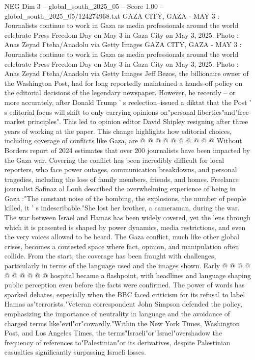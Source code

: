 \begin{textsample}{NEG Dim 3 – global\_south\_2025\_05 – Score 1.00 – global\_south\_2025\_05/124274968.txt}  \label{ex:f3_neg_226}
GAZA CITY, GAZA - MAY 3 : Journalists continue to work in Gaza as media professionals around the world celebrate Press Freedom Day on May 3 in Gaza City on May 3, 2025.
Photo : Anas Zeyad Fteha/Anadolu via Getty Images GAZA CITY, GAZA - MAY 3 : Journalists continue to work in Gaza as media professionals around the world celebrate Press Freedom Day on May 3 in Gaza City on May 3, 2025.
Photo : Anas Zeyad Fteha/Anadolu via Getty Images Jeff Bezos, the billionaire owner of the Washington Post, had for long reportedly maintained a hands-off policy on the editorial decisions of the legendary newspaper.
However, he recently -- or more accurately, after Donald Trump ' s reelection--issued a diktat that the Post ' s editorial focus will shift to only carrying opinions on"personal liberties"and"free-market principles".
This led to opinion editor David Shipley resigning after three years of working at the paper.
This change highlights how editorial choices, including coverage of conflicts like Gaza, are @ @ @ @ @ @ @ @ @ @ Without Borders report of 2024 estimates that over 200 journalists have been impacted by the Gaza war.
Covering the conflict has been incredibly difficult for local reporters, who face power outages, communication breakdowns, and personal tragedies, including the loss of family members, friends, and homes.
Freelance journalist Safinaz al Louh described the overwhelming experience of being in Gaza :"The constant noise of the bombing, the explosions, the number of people killed, it ' s indescribable."She lost her brother, a cameraman, during the war.
The war between Israel and Hamas has been widely covered, yet the lens through which it is presented is shaped by power dynamics, media restrictions, and even the very voices allowed to be heard.
The Gaza conflict, much like other global crises, becomes a contested space where fact, opinion, and manipulation often collide.
From the start, the coverage has been fraught with challenges, particularly in terms of the language used and the images shown.
Early @ @ @ @ @ @ @ @ @ @ hospital became a flashpoint, with headlines and language shaping public perception even before the facts were confirmed.
The power of words has sparked debates, especially when the BBC faced criticism for its refusal to label Hamas as"terrorists."Veteran correspondent John Simpson defended the policy, emphasizing the importance of neutrality in language and the avoidance of charged terms like"evil"or"cowardly."Within the New York Times, Washington Post, and Los Angeles Times, the terms"Israeli"or"Israel"overshadow the frequency of references to"Palestinian"or its derivatives, despite Palestinian casualties significantly surpassing Israeli losses.

\end{textsample}
